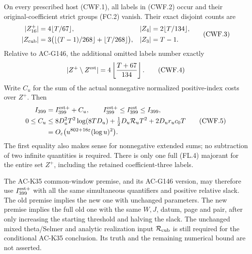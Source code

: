 \begin{theorem}
\label{AC-G148-window}
On every prescribed host (CWF.1), all labels in (CWF.2) occur and
their original-coefficient strict groups (FC.2) vanish.
Their exact disjoint counts are
\[
 \begin{aligned}
 |Z_{16}^{+}|&=4\lfloor T/67\rfloor,&
 |Z_4|&=2\lfloor T/134\rfloor,\\
 |Z_{\rm cub}|&=3\bigl(\lfloor(T-1)/268\rfloor
                            +\lfloor T/268\rfloor\bigr),&
 |Z_3|&=T-1.
 \end{aligned}
 \tag{CWF.3}
\]
Relative to AC-G146, the additional omitted labels number exactly
\[
 |Z^+\setminus Z^{\rm est}|
     =4\left\lfloor\frac{T+67}{134}\right\rfloor.
 \tag{CWF.4}
\]
Write $C_u$ for the sum of the actual nonnegative normalized
positive-index costs over $Z^+$.  Then
\[
 \begin{aligned}
 I_{399}&=I_{399}^{\rm est+}+C_u,\qquad
 I_{399}^{\rm est+}\leq I_{399}^{\rm est}\leq I_{399},\\
 0\leq C_u&\leq
 8D_u^2T^2\log(8TD_u)+\tfrac12D_u\mathcal R_uT^2
                                      +2D_ur_uc_0T\\
 &=O_\varepsilon\bigl(u^{802+16\varepsilon}(\log u)^2\bigr).
 \end{aligned}
 \tag{CWF.5}
\]
The first equality also makes sense for nonnegative extended sums;
no subtraction of two infinite quantities is required.
There is only one full (FL.4) majorant for the entire set $Z^+$,
including the retained coefficient-three labels.

The AC-K35 common-window premise, and its AC-G146 version, may
therefore use $I_{399}^{\rm est+}$ with all the same simultaneous
quantifiers and positive relative slack.  The old premise implies
the new one with unchanged parameters.  The new premise implies
the full old one with the same $W,J$, datum, page and pair, after
only increasing the starting threshold and halving the slack.
The unchanged mixed theta/Selmer and analytic realization input
$\mathcal R_{\rm cub}$ is still required for the conditional
AC-K35 conclusion.  Its truth and the remaining numerical bound
are not asserted.
\end{theorem}

